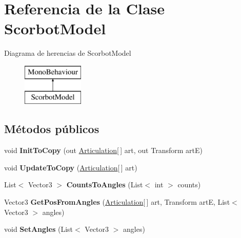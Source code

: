 \hypertarget{class_scorbot_model}{}\section{Referencia de la Clase Scorbot\+Model}
\label{class_scorbot_model}
Diagrama de herencias de Scorbot\+Model\begin{figure}[H]
\begin{center}
\leavevmode
\includegraphics[height=2.000000cm]{class_scorbot_model}
\end{center}
\end{figure}
\subsection*{Métodos públicos}
\begin{DoxyCompactItemize}
\item 
\mbox{\label{class_scorbot_model_aba471bffb5190b184e14ce3598784d47}} 
void {\bfseries Init\+To\+Copy} (out \mbox{\hyperlink{class_articulation}{Articulation}}\mbox{[}$\,$\mbox{]} art, out Transform artE)
\item 
\mbox{\label{class_scorbot_model_a78e73b1e1b2cda29a55529326ba2ca90}} 
void {\bfseries Update\+To\+Copy} (\mbox{\hyperlink{class_articulation}{Articulation}}\mbox{[}$\,$\mbox{]} art)
\item 
\mbox{\label{class_scorbot_model_a30c77a2653cea0ff41081d150b7e3bca}} 
List$<$ Vector3 $>$ {\bfseries Counts\+To\+Angles} (List$<$ int $>$ counts)
\item 
\mbox{\label{class_scorbot_model_ad09db01ea00a7f638ecbeabce57737cf}} 
Vector3 {\bfseries Get\+Pos\+From\+Angles} (\mbox{\hyperlink{class_articulation}{Articulation}}\mbox{[}$\,$\mbox{]} art, Transform artE, List$<$ Vector3 $>$ angles)
\item 
\mbox{\label{class_scorbot_model_a74549ede37f30edafb1dbf07c0730cdd}} 
void {\bfseries Set\+Angles} (List$<$ Vector3 $>$ angles)
\end{DoxyCompactItemize}
